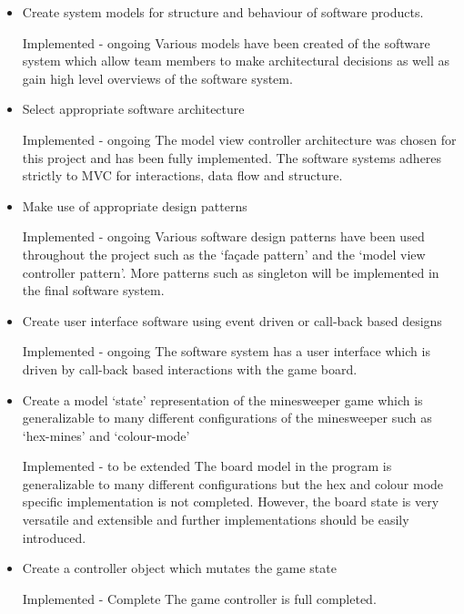 \documentclass[12pt, a4]{report}
\begin{document}
\begin{itemize}
	\item Create system models for structure and behaviour of software products.
	\par \textcolor{codegreen}{Implemented - ongoing \textbar{} } Various models have been created of the software system which allow team members to make architectural decisions as well as gain high level overviews of the software system.
	
	\item Select appropriate software architecture
	\par \textcolor{codegreen}{Implemented - ongoing \textbar{} } The model view controller architecture was chosen for this project and has been fully implemented. The software systems adheres strictly to MVC for interactions, data flow and structure. 

	\item Make use of appropriate design patterns
	\par \textcolor{codegreen}{Implemented - ongoing \textbar{} } Various software design patterns have been used throughout the project such as the `façade pattern' and the `model view controller pattern'. More patterns such as singleton will be implemented in the final software system.

	\item Create user interface software using event driven or call-back based designs
	\par \textcolor{codegreen}{Implemented - ongoing \textbar{} } The software system has a user interface which is driven by call-back based interactions with the game board.

	\item Create a model `state' representation of the minesweeper game which is generalizable to many different configurations of the minesweeper such as `hex-mines' and `colour-mode'
	\par \textcolor{fawn}{Implemented - to be extended \textbar{} } The board model in the program is generalizable to many different configurations but the hex and colour mode specific implementation is not completed. However, the board state is very versatile and extensible and further implementations should be easily introduced.

	\item Create a controller object which mutates the game state
	\par \textcolor{codegreen}{Implemented - Complete \textbar{} } The game controller is full completed.


\end{itemize}
\end{document}
